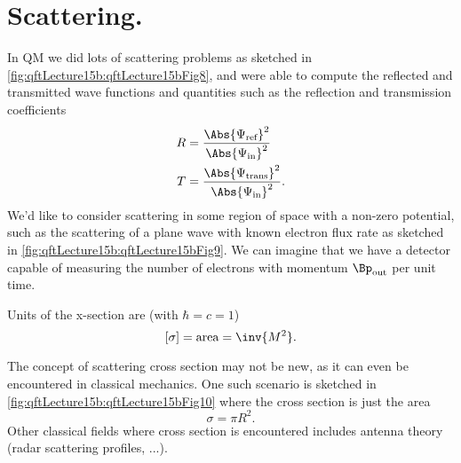 %
%
\section{Scattering.}
In QM we did lots of scattering problems as sketched in \cref{fig:qftLecture15b:qftLecture15bFig8},
and were able to compute the reflected and transmitted wave functions and quantities such as the reflection and transmission coefficients
\begin{dmath}\label{eqn:qftLecture15b:440}
\begin{aligned}
R &= \frac
{\Abs{ \Psi_{\text{ref}}}^2}
{\Abs{ \Psi_{\text{in}}}^2} \\
T &= \frac
{\Abs{ \Psi_{\text{trans}}}^2}
{\Abs{ \Psi_{\text{in}}}^2}.
\end{aligned}
\end{dmath}
We'd like to consider scattering in some region of space with a non-zero potential, such as the scattering of a plane wave with known electron flux rate as sketched in
\cref{fig:qftLecture15b:qftLecture15bFig9}.
We can imagine that we have a detector capable of measuring the number of electrons with momentum \( \Bp_{\text{out}} \) per unit time.


Units of the x-section are (with \( \hbar = c = 1 \))
\begin{equation}\label{eqn:qftLecture15b:480}
[\sigma] = \text{area} = \inv{M^2}.
\end{equation}

The concept of scattering cross section may not be new, as it can even be encountered in classical mechanics.  One such scenario is sketched in \cref{fig:qftLecture15b:qftLecture15bFig10} where the cross section is just the area
\begin{dmath}\label{eqn:qftLecture15b:500}
\sigma = \pi R^2.
\end{dmath}
Other classical fields where cross section is encountered includes antenna theory (radar scattering profiles, ...).


